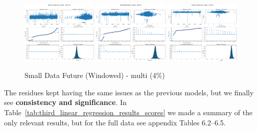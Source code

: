 \documentclass[11pt,english,a4paper,hidelinks]{book}
\begin{document}
\begin{figure}[H]
    \centering
    \includegraphics[width=0.32\textwidth]{images/code/models/linear_regression/third_model/Multi/quality_profit_1m_residuals.png}
    \includegraphics[width=0.32\textwidth]{images/code/models/linear_regression/third_model/Multi/quality_profit_1y_residuals.png}
    \includegraphics[width=0.32\textwidth]{images/code/models/linear_regression/third_model/Multi/quality_profit_5y_residuals.png}
    \caption{Small Data Future (Windowed) - \acrshort{multi} (4\%)}
    \label{fig:third_linear_regression_residuals}
\end{figure}

\noindent The residues kept having the same issues as the previous models, but we finally see \textbf{consistency and significance}. In Table~\ref{tab:third_linear_regression_results_scores} we made a summary of the only relevant results, but for the full data see appendix Tables 6.2--6.5.
\end{document}
